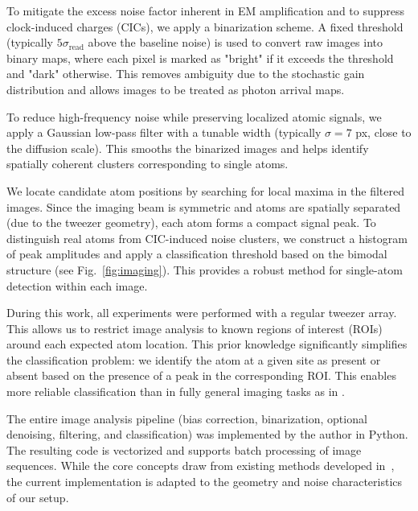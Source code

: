 To mitigate the excess noise factor inherent in EM amplification and to suppress clock-induced charges (CICs), we apply a binarization scheme. A fixed threshold (typically $5\sigma_\text{read}$ above the baseline noise) is used to convert raw images into binary maps, where each pixel is marked as "bright" if it exceeds the threshold and "dark" otherwise. This removes ambiguity due to the stochastic gain distribution and allows images to be treated as photon arrival maps.  

To reduce high-frequency noise while preserving localized atomic signals, we apply a Gaussian low-pass filter with a tunable width (typically $\sigma = 7$ px, close to the diffusion scale). This smooths the binarized images and helps identify spatially coherent clusters corresponding to single atoms. 

We locate candidate atom positions by searching for local maxima in the filtered images. Since the imaging beam is symmetric and atoms are spatially separated (due to the tweezer geometry), each atom forms a compact signal peak. To distinguish real atoms from CIC-induced noise clusters, we construct a histogram of peak amplitudes and apply a classification threshold based on the bimodal structure (see Fig.~\ref{fig:imaging}). This provides a robust method for single-atom detection within each image.

During this work, all experiments were performed with a regular tweezer array. This allows us to restrict image analysis to known regions of interest (ROIs) around each expected atom location. This prior knowledge significantly simplifies the classification problem: we identify the atom at a given site as present or absent based on the presence of a peak in the corresponding ROI. This enables more reliable classification than in fully general imaging tasks as in \cite{bergschneider_spin-resolved_2018}.

The entire image analysis pipeline (bias correction, binarization, optional denoising, filtering, and classification) was implemented by the author in Python. The resulting code is vectorized and supports batch processing of image sequences. While the core concepts draw from existing methods developed in~\cite{bergschneider_spin-resolved_2018}, the current implementation is adapted to the geometry and noise characteristics of our setup. 
